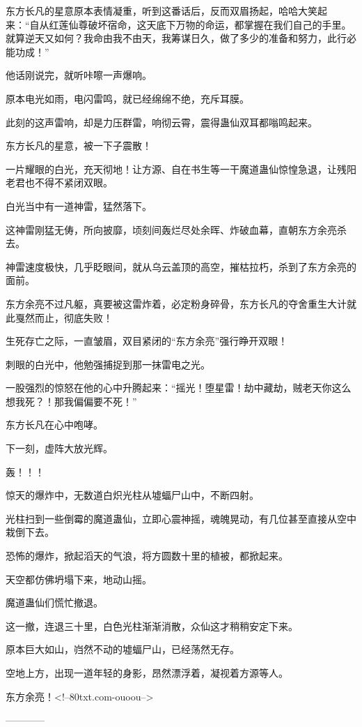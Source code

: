 \begin{this_body}
东方长凡的星意原本表情凝重，听到这番话后，反而双眉扬起，哈哈大笑起来：“自从红莲仙尊破坏宿命，这天底下万物的命运，都掌握在我们自己的手里。就算逆天又如何？我命由我不由天，我筹谋日久，做了多少的准备和努力，此行必能功成！”

他话刚说完，就听咔嚓一声爆响。

原本电光如雨，电闪雷鸣，就已经绵绵不绝，充斥耳膜。

此刻的这声雷响，却是力压群雷，响彻云霄，震得蛊仙双耳都嗡鸣起来。

东方长凡的星意，被一下子震散！

一片耀眼的白光，充天彻地！让方源、自在书生等一干魔道蛊仙惊惶急退，让残阳老君也不得不紧闭双眼。

白光当中有一道神雷，猛然落下。

这神雷刚猛无俦，所向披靡，顷刻间轰烂尽处余晖、炸破血幕，直朝东方余亮杀去。

神雷速度极快，几乎眨眼间，就从乌云盖顶的高空，摧枯拉朽，杀到了东方余亮的面前。

东方余亮不过凡躯，真要被这雷炸着，必定粉身碎骨，东方长凡的夺舍重生大计就此戛然而止，彻底失败！

生死存亡之际，一直皱眉，双目紧闭的“东方余亮”强行睁开双眼！

刺眼的白光中，他勉强捕捉到那一抹雷电之光。

一股强烈的惊怒在他的心中升腾起来：“摇光！堕星雷！劫中藏劫，贼老天你这么想我死？！那我偏偏要不死！”

东方长凡在心中咆哮。

下一刻，虚阵大放光辉。

轰！！！

惊天的爆炸中，无数道白炽光柱从墟蝠尸山中，不断四射。

光柱扫到一些倒霉的魔道蛊仙，立即心震神摇，魂魄晃动，有几位甚至直接从空中栽倒下去。

恐怖的爆炸，掀起滔天的气浪，将方圆数十里的植被，都掀起来。

天空都仿佛坍塌下来，地动山摇。

魔道蛊仙们慌忙撤退。

这一撤，连退三十里，白色光柱渐渐消散，众仙这才稍稍安定下来。

原本巨大如山，岿然不动的墟蝠尸山，已经荡然无存。

空地上方，出现一道年轻的身影，昂然漂浮着，凝视着方源等人。

东方余亮！<!--80txt.com-ouoou-->

------------

\end{this_body}

